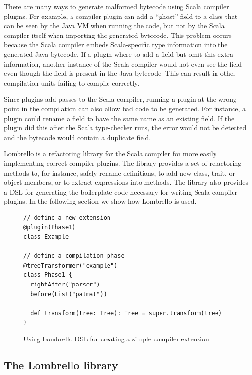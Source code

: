 \documentclass{article}
\begin{document}
There are many ways to generate malformed bytecode using Scala compiler
plugins.  For example, a compiler plugin can add a ``ghost'' field to a class
that can be seen by the Java VM when running the code, but not by the Scala
compiler itself when importing the generated bytecode.  This problem occurs
because the Scala compiler embeds Scala-specific type information into the
generated Java bytecode. If a plugin where to add a field but omit this extra
information, another instance of the Scala compiler would not even see the
field even though the field is present in the Java bytecode. This can result in
other compilation units failing to compile correctly.

Since plugins add passes to the Scala compiler, running a plugin at the wrong
point in the compilation can also allow bad code to be generated.  For
instance, a plugin could rename a field to have the same name as an existing
field. If the plugin did this after the Scala type-checker runs, the error
would not be detected and the bytecode would contain a duplicate field.


Lombrello is a refactoring library for the Scala compiler for more easily
implementing correct compiler plugins.  The library  provides a set of
refactoring methods to, for instance, safely rename definitions, to add new
class, trait, or object members, or to extract expressions into methods. The
library also provides a DSL for generating the boilerplate code necessary for
writing Scala compiler plugins. In the following section we show how Lombrello
is used.  


\begin{figure}[tp]
\begin{lstlisting}
// define a new extension
@plugin(Phase1)
class Example

// define a compilation phase
@treeTransformer("example")
class Phase1 {
  rightAfter("parser")
  before(List("patmat"))

  def transform(tree: Tree): Tree = super.transform(tree)
}
\end{lstlisting}
\caption{Using Lombrello DSL for creating a simple compiler extension}
\label{lst:neveMini} 
\end{figure}


\subsection{The Lombrello library}
\end{document}
